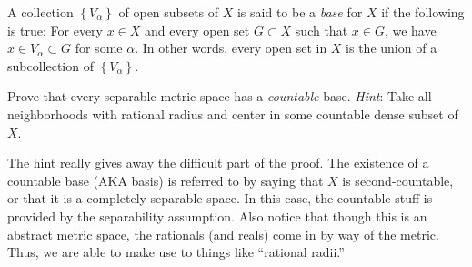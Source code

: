 \documentclass[12pt]{article}
\newenvironment{problem}[2][Exercise]{\begin{trivlist}
\item[\hskip \labelsep {\bfseries #1}\hskip \labelsep {\bfseries #2.}]}{\end{trivlist}}
\begin{document}
\begin{problem}{2.23}
A collection $\left\{V_{\alpha}\right\}$ of open subsets of $X$ is said to be a \textit{base} for $X$ if the following is true: For every $x\in X$ and every open set $G \subset X$ such that $x \in G$, we have $x \in V_{\alpha} \subset G$ for some $\alpha$. In other words, every open set in $X$ is the union of a subcollection of $\left\{V_{\alpha}\right\}$.

Prove that every separable metric space has a \textit{countable} base. \textit{Hint}: Take all neighborhoods with rational radius and center in some countable dense subset of $X$.
\end{problem}
{\color{red}The hint really gives away the difficult part of the proof. The existence of a countable base (AKA basis) is referred to by saying that $X$ is second-countable, or that it is a completely separable space. In this case, the countable stuff is provided by the separability assumption. Also notice that though this is an abstract metric space, the rationals (and reals) come in by way of the metric. Thus, we are able to make use to things like ``rational radii.''}\\
\end{document}
